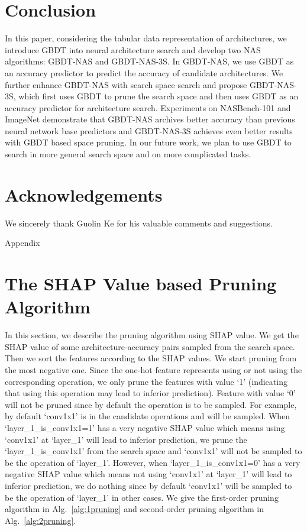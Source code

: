 \documentclass{article}
\begin{document}
\section{Conclusion}
In this paper, considering the tabular data representation of architectures, we introduce GBDT into neural architecture search and develop two NAS algorithms: GBDT-NAS and GBDT-NAS-3S. In GBDT-NAS, we use GBDT as an accuracy predictor to predict the accuracy of candidate architectures. We further enhance GBDT-NAS with search space search and propose GBDT-NAS-3S, which first uses GBDT to prune the search space and then uses GBDT as an accuracy predictor for architecture search. Experiments on NASBench-101 and ImageNet demonstrate that GBDT-NAS archives better accuracy than previous neural network base predictors and GBDT-NAS-3S achieves even better results with GBDT based space pruning. In our future work, we plan to use GBDT to search in more general search space and on more complicated tasks.

\section*{Acknowledgements}
We sincerely thank Guolin Ke for his valuable comments and suggestions.





\clearpage
\centerline{\Huge{Appendix}}

\setcounter{section}{0}

\section{The SHAP Value based Pruning Algorithm}
In this section, we describe the pruning algorithm using SHAP value. We get the SHAP value of some architecture-accuracy pairs sampled from the search space. Then we sort the features according to the SHAP values. We start pruning from the most negative one. Since the one-hot feature represents using or not using the corresponding operation, we only prune the features with value `1' (indicating that using this operation may lead to inferior prediction). Feature with value `0' will not be pruned since by default the operation is to be sampled. For example, by default `conv1x1' is in the candidate operations and will be sampled. When `layer\_1\_is\_conv1x1=1' has a very negative SHAP value which means using `conv1x1' at `layer\_1' will lead to inferior prediction, we prune the `layer\_1\_is\_conv1x1' from the search space and `conv1x1' will not be sampled to be the operation of `layer\_1'. However, when `layer\_1\_is\_conv1x1=0' has a very negative SHAP value which means not using `conv1x1' at `layer\_1' will lead to inferior prediction, we do nothing since by default `conv1x1' will be sampled to be the operation of `layer\_1' in other cases. We give the first-order pruning algorithm in Alg.~\ref{alg:1pruning} and second-order pruning algorithm in Alg.~\ref{alg:2pruning}.
\end{document}
